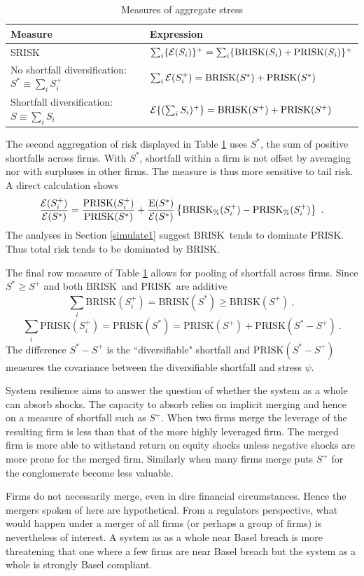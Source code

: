 \documentclass[authoryear]{elsarticle}
\newcommand{\E}{\mathrm{E}}
\newcommand{\Ex}{{\cal E}}
\newcommand{\Es}{\Ex}
\newcommand{\br}{\ensuremath{\mathrm{BRISK}}}
\newcommand{\pr}{\ensuremath{\mathrm{PRISK}}}
\newcommand{\sref}[1]{Section \ref{#1}}
\newcommand{\tref}[1]{Table \ref{#1}}
\newcommand{\be}[1]{\begin{equation}\label{#1}}
\newcommand{\ee}{\end{equation}}
\begin{document}
\begin{table}[htbp]
\caption{Measures of aggregate stress}\label{aggstress}
\small
\begin{center}
\begin{tabular}{l|l}
\hline
Measure&Expression\\
\hline
SRISK \citep{brownlees2015} & $\sum_i\{\Es(S_i)\}^+=\sum_i\{\br(S_i)+\pr(S_i)\}^+$ \\
No shortfall diversification: $S^*\equiv\sum_iS_i^+$  &$\sum_i\Es(S_i^+)=\br(S^*) +\pr(S^*)$ \\
Shortfall diversification:
$ S\equiv \sum_iS_i$&$\Es\{(\sum_iS_i)^+\}=\br(S^+) +\pr(S^+)$\\
\hline
\end{tabular}
\end{center}
\normalsize
\end{table}%

The second aggregation of risk displayed in \tref{aggstress} uses $S^*$, the  sum of positive shortfalls across firms.  With $S^*$, shortfall within a firm is not offset by averaging  nor with surpluses in other firms. The measure is thus more sensitive to tail risk.   A direct calculation shows 
\be{percc}
\frac{\Es(S_i^+)}{\Es(S^*)} =  \frac{\pr(S^+_i)}{\pr(S^*)}+\frac{\E(S^*)}{\Es(S^*)}\left\{\br_\%(S^+_i)-\pr_\%(S^+_i)\right\}\ .
\ee
The analyses in \sref{simulate1} suggest \br\ tends to dominate \pr.   Thus total risk tends to be dominated by \br.
 
 The final  row measure of \tref{aggstress}  allows for pooling of  shortfall across firms.  Since $S^*\ge S^+$ and both \br\  and \pr\ are additive 
 $$
 \sum_i\br(S_i^+)=\br(S^*)\ge\br(S^+)\ ,
 $$$$
 \sum_i\pr(S_i^+)=\pr(S^*) = \pr(S^+)+\pr(S^*-S^+)\ .
 $$
The difference $S^*-S^+$ is the ``diversifiable" shortfall and $\pr(S^*-S^+)$ measures the covariance between the diversifiable shortfall and  stress $\psi$.

System resilience aims to answer the question of whether the system as a whole can absorb shocks.   The capacity to absorb relies on implicit merging and hence on a measure of shortfall such as $S^+$.    When two firms merge the leverage of the resulting firm is less than that of the more highly leveraged firm.   The merged firm is more able to withstand return on equity shocks  unless negative shocks are more prone for the merged firm.   Similarly when many firms merge  puts $S^+$ for the conglomerate become less valuable.

Firms do not necessarily merge, even in dire financial circumstances.   Hence the mergers spoken of here are hypothetical.   From a regulators perspective, what would happen under a merger of all firms (or perhaps a group of firms) is nevertheless of interest.   A system as as a whole near Basel breach is more threatening that one where a few firms are near Basel breach but the system as a whole is strongly Basel compliant.
\end{document}
